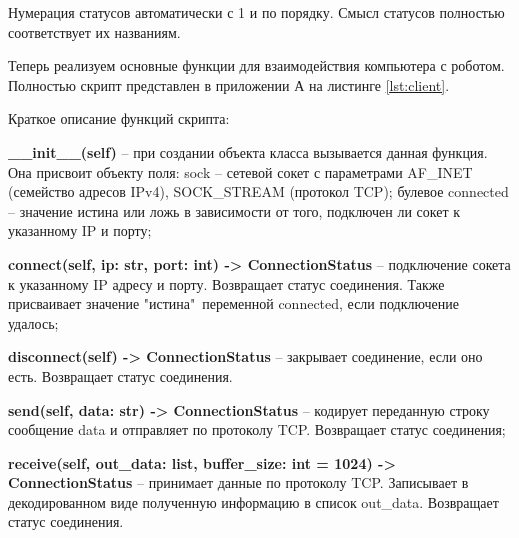 \documentclass[a4paper,14pt]{extarticle}
\begin{document}
Нумерация статусов автоматически с 1 и по порядку.
Смысл статусов полностью соответствует их названиям.


Теперь реализуем основные функции для взаимодействия компьютера с роботом.
Полностью скрипт представлен в приложении А на листинге \ref{lst:client}.


Краткое описание функций скрипта:
\begin{compactitem}
    \item \textbf{\_\_init\_\_(self)} -- при создании объекта класса вызывается
    данная функция. Она присвоит объекту поля: sock -- сетевой сокет с параметрами
    AF\_INET (семейство адресов IPv4), SOCK\_STREAM (протокол TCP);
    булевое connected -- значение истина или ложь в зависимости от
    того, подключен ли сокет к указанному IP и порту;
    \item \textbf{connect(self, ip: str, port: int) -> ConnectionStatus} --
    подключение сокета к указанному IP адресу и порту. Возвращает
    статус соединения. Также присваивает значение "истина"\,
    переменной connected, если подключение удалось;
    \item \textbf{disconnect(self) -> ConnectionStatus} -- закрывает
    соединение, если оно есть. Возвращает статус соединения.
    \item \textbf{send(self, data: str) -> ConnectionStatus} --
    кодирует переданную строку сообщение data и отправляет по
    протоколу TCP. Возвращает статус соединения;
    \item \textbf{receive(self, out\_data: list, buffer\_size: int = 1024) -> ConnectionStatus}
    -- принимает данные по протоколу TCP. Записывает в декодированном виде
    полученную информацию в список out\_data. Возвращает статус соединения.
\end{compactitem}




\end{document}
